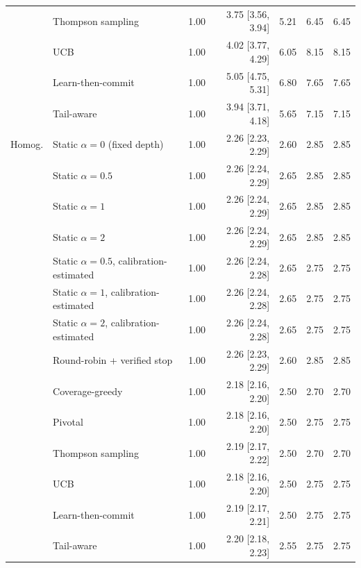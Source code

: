 \begin{table}[!t]
\begin{tabular}{@{}llrrrrr@{}}
 & Thompson sampling & 1.00 & 3.75 [3.56, 3.94] & 5.21 & 6.45 & 6.45 \\
 & UCB & 1.00 & 4.02 [3.77, 4.29] & 6.05 & 8.15 & 8.15 \\
 & Learn-then-commit & 1.00 & 5.05 [4.75, 5.31] & 6.80 & 7.65 & 7.65 \\
 & Tail-aware & 1.00 & 3.94 [3.71, 4.18] & 5.65 & 7.15 & 7.15 \\
\midrule
Homog. & Static $\alpha{=}0$ (fixed depth) & 1.00 & 2.26 [2.23, 2.29] & 2.60 & 2.85 & 2.85 \\
 & Static $\alpha{=}0.5$ & 1.00 & 2.26 [2.24, 2.29] & 2.65 & 2.85 & 2.85 \\
 & Static $\alpha{=}1$ & 1.00 & 2.26 [2.24, 2.29] & 2.65 & 2.85 & 2.85 \\
 & Static $\alpha{=}2$ & 1.00 & 2.26 [2.24, 2.29] & 2.65 & 2.85 & 2.85 \\
 & Static $\alpha{=}0.5$, calibration-estimated & 1.00 & 2.26 [2.24, 2.28] & 2.65 & 2.75 & 2.75 \\
 & Static $\alpha{=}1$, calibration-estimated & 1.00 & 2.26 [2.24, 2.28] & 2.65 & 2.75 & 2.75 \\
 & Static $\alpha{=}2$, calibration-estimated & 1.00 & 2.26 [2.24, 2.28] & 2.65 & 2.75 & 2.75 \\
 & Round-robin + verified stop & 1.00 & 2.26 [2.23, 2.29] & 2.60 & 2.85 & 2.85 \\
 & Coverage-greedy & 1.00 & 2.18 [2.16, 2.20] & 2.50 & 2.70 & 2.70 \\
 & Pivotal & 1.00 & 2.18 [2.16, 2.20] & 2.50 & 2.75 & 2.75 \\
 & Thompson sampling & 1.00 & 2.19 [2.17, 2.22] & 2.50 & 2.70 & 2.70 \\
 & UCB & 1.00 & 2.18 [2.16, 2.20] & 2.50 & 2.75 & 2.75 \\
 & Learn-then-commit & 1.00 & 2.19 [2.17, 2.21] & 2.50 & 2.75 & 2.75 \\
 & Tail-aware & 1.00 & 2.20 [2.18, 2.23] & 2.55 & 2.75 & 2.75 \\
\bottomrule
\end{tabular}
\end{table}

